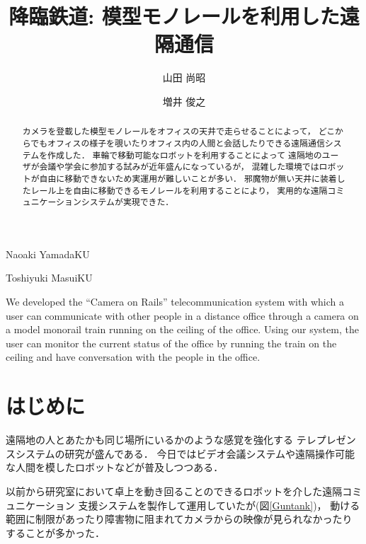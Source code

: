 \documentclass[submit,techreq]{ipsj}
\begin{document}
\title{降臨鉄道: 模型モノレールを利用した遠隔通信}


\author{山田 尚昭}{Naoaki Yamada}{KU}
\author{増井 俊之}{Toshiyuki Masui}{KU}

\begin{abstract}
カメラを登載した模型モノレールをオフィスの天井で走らせることによって，
どこからでもオフィスの様子を覗いたりオフィス内の人間と会話したりできる遠隔通信システムを作成した．
車輪で移動可能なロボットを利用することによって
遠隔地のユーザが会議や学会に参加する試みが近年盛んになっているが，
混雑した環境ではロボットが自由に移動できないため実運用が難しいことが多い．
邪魔物が無い天井に装着したレール上を自由に移動できるモノレールを利用することにより，
実用的な遠隔コミュニケーションシステムが実現できた．
\end{abstract}

\begin{eabstract}
We developed the ``Camera on Rails'' telecommunication system with
which a user can communicate with other people in a
distance office through a camera on a model monorail train running on the ceiling
of the office. Using our system, the user can monitor the current status
of the office by running the train on the ceiling and have
conversation with the people in the office.
\end{eabstract}

\maketitle

\section{はじめに}

遠隔地の人とあたかも同じ場所にいるかのような感覚を強化する
テレプレゼンスシステムの研究が盛んである．
今日ではビデオ会議システムや遠隔操作可能な人間を模したロボットなどが普及しつつある．

以前から研究室において卓上を動き回ることのできるロボットを介した遠隔コミュニケーション
支援システムを製作して運用していたが(図\ref{Guntank})\cite{Hirota:Korin}，
動ける範囲に制限があったり障害物に阻まれてカメラからの映像が見られなかったり
することが多かった．
\end{document}
